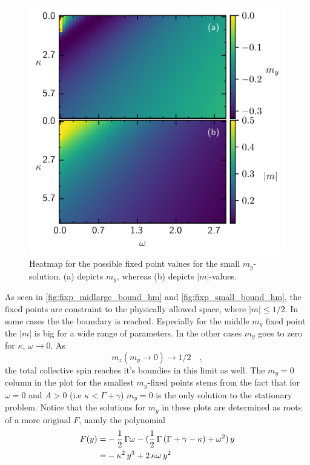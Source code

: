 \documentclass{article}
\begin{document}
\begin{figure}
    \includegraphics{pictures/fixp_bound_heatmap_s.png}
    \vspace*{-2cm}\caption{Heatmap for the possible fixed point values for the small $m_y$-solution. (a) depicts $m_y$, whereas (b) depicts $|m|$-values.}
    \label{fig:fixp_small_bound_hm}
\end{figure}
As seen in \autoref{fig:fixp_midlarge_bound_hm} and \autoref{fig:fixp_small_bound_hm}, the fixed points are constraint to the physically allowed space, where $|m|\leq1/2$. In some cases the the boundary is reached. Especially for the middle $m_y$ fixed point the $|m|$ is big for a wide range of parameters. In the other cases $m_y$ goes to zero for $\kappa,\,\omega\rightarrow0$. As $$m_z(m_y\rightarrow0)\rightarrow1/2\quad,$$
the total collective spin reaches it's boundies in this limit as well. The $m_y=0$ column in the plot for the smallest $m_y$-fixed points stems from the fact that for $\omega=0$ and $A>0$ (i.e $\kappa<\Gamma+\gamma$) $m_y=0$ is the only solution to the stationary problem. Notice that the solutions for $m_y$ in these plots are determined as roots of a more original $F$, namly the polynomial
\begin{align*}
    F(y)=&-\frac{1}{2}\,\Gamma\omega-(\frac{1}{2}\,\Gamma\,(\Gamma+\gamma-\kappa)+\omega^2)\,y\\=&-\kappa^2\,y^3+2\,\kappa\omega\,y^2
\end{align*}
\end{document}
